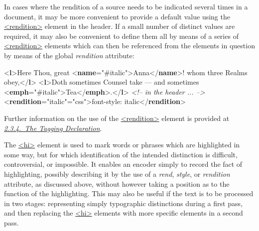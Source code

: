 In cases where the rendition of a source needs to be indicated several times in a document, it may be more convenient to provide a default value using the \hyperref[TEI.rendition]{<rendition>} element in the header. If a small number of distinct values are required, it may also be convenient to define them all by means of a series of \hyperref[TEI.rendition]{<rendition>} elements which can then be referenced from the elements in question by means of the global {\itshape rendition} attribute: \par\bgroup{}\exampleFont \begin{shaded}\noindent\mbox{}{<\textbf{l}>}Here Thou, great {<\textbf{name}\hspace*{1em}{rendition}="{\#italic}">}Anna{</\textbf{name}>}!\mbox{}\newline 
 whom three Realms obey,{</\textbf{l}>}\mbox{}\newline 
{<\textbf{l}>}Doth sometimes Counsel take —\mbox{}\newline 
 and sometimes {<\textbf{emph}\hspace*{1em}{rendition}="{\#italic}">}Tea{</\textbf{emph}>}.{</\textbf{l}>}\mbox{}\newline 
\textit{<!-- in the header ... -->}\mbox{}\newline 
{<\textbf{rendition}\hspace*{1em}{xml:id}="{italic}"\hspace*{1em}{scheme}="{css}">}font-style: italic{</\textbf{rendition}>}\end{shaded}\egroup\par \noindent  Further information on the use of the \hyperref[TEI.rendition]{<rendition>} element is provided at \textit{\hyperref[HD57]{2.3.4.\ The Tagging Declaration}}.\par
The \hyperref[TEI.hi]{<hi>} element is used to mark words or phrases which are highlighted in some way, but for which identification of the intended distinction is difficult, controversial, or impossible. It enables an encoder simply to record the fact of highlighting, possibly describing it by the use of a {\itshape rend}, {\itshape style}, or {\itshape rendition} attribute, as discussed above, without however taking a position as to the function of the highlighting. This may also be useful if the text is to be processed in two stages: representing simply typographic distinctions during a first pass, and then replacing the \hyperref[TEI.hi]{<hi>} elements with more specific elements in a second pass.\par
